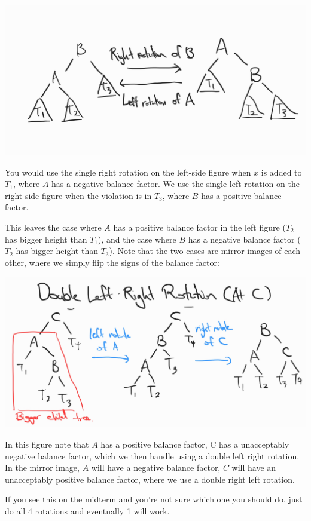 \includegraphics{csc265/figures/avlleftandrightrotation.jpg}

You would use the single right rotation on the left-side figure when $x$  is added to $T_1$, where $A$ has a negative balance factor. We use the single left rotation on the right-side figure when the violation is in $T_3$, where $B$ has a positive balance factor.

This leaves the case where $A$ has a positive balance factor in the left figure ($T_2$ has bigger height than $T_1$), and the case where $B$ has a negative balance factor ($T_2$ has bigger height than $T_3$). Note that the two cases are mirror images of each other, where we simply flip the signs of the balance factor:

\includegraphics{csc265/figures/avldoubleleftrightrotation.jpg}

In this figure note that $A$ has a positive balance factor, C has a unacceptably negative balance factor, which we then handle using a double left right rotation. In the mirror image, $A$ will have a negative balance factor, $C$ will have an unacceptably positive balance factor, where we use a double right left rotation. 

\begin{remark}
If you see this on the midterm and you're not sure which one you should do, just do all 4 rotations and eventually 1 will work.
\end{remark}

